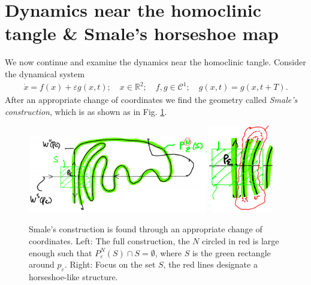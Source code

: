 \section{Dynamics near the homoclinic tangle \& Smale's horseshoe map}
We now continue and examine the dynamics near the homoclinic tangle. Consider the dynamical system
\begin{align}
	\dot{x} = f(x) + \varepsilon g(x,t);\quad x \in \mathbb{R}^{2};\quad f,g \in  \mathcal{C}^{1};\quad g(x,t) = g(x,t+T).
\end{align}
After an appropriate change of coordinates we find the geometry called \emph{Smale's construction}, which is as shown as in Fig. \ref{fig:smales_construction}.
\begin{figure}[h!]
	\centering
	\includegraphics[width=0.7\textwidth]{figures/ch6/16smales_construction1.png}
	\hspace{0.03\textwidth}
	\includegraphics[width=0.25\textwidth]{figures/ch6/16smales_construction2.png}
	\caption{Smale's construction is found through an appropriate change of coordinates. Left: The full construction, the $N$ circled in red is large enough such that $P^{N}_{\varepsilon}(S)\cap S = \emptyset$, where $S$ is the green rectangle around $p_{\varepsilon}$. Right: Focus on the set $S$, the red lines designate a horseshoe-like structure.}
	\label{fig:smales_construction}
\end{figure}

